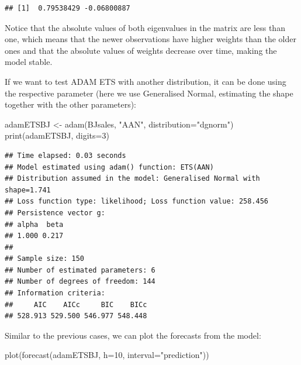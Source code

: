 \documentclass[
]{book}
\newenvironment{Shaded}{\begin{snugshade}}{\end{snugshade}}
\newcommand{\AttributeTok}[1]{\textcolor[rgb]{0.77,0.63,0.00}{#1}}
\newcommand{\DecValTok}[1]{\textcolor[rgb]{0.00,0.00,0.81}{#1}}
\newcommand{\FunctionTok}[1]{\textcolor[rgb]{0.00,0.00,0.00}{#1}}
\newcommand{\NormalTok}[1]{#1}
\newcommand{\OtherTok}[1]{\textcolor[rgb]{0.56,0.35,0.01}{#1}}
\newcommand{\StringTok}[1]{\textcolor[rgb]{0.31,0.60,0.02}{#1}}
\theoremstyle{definition}
\theoremstyle{definition}
\theoremstyle{definition}
\theoremstyle{definition}
\theoremstyle{remark}
\begin{document}
\begin{verbatim}
## [1]  0.79538429 -0.06800887
\end{verbatim}

Notice that the absolute values of both eigenvalues in the matrix are less than one, which means that the newer observations have higher weights than the older ones and that the absolute values of weights decrease over time, making the model stable.

If we want to test ADAM ETS with another distribution, it can be done using the respective parameter (here we use Generalised Normal, estimating the shape together with the other parameters):

\begin{Shaded}
\begin{Highlighting}[]
\NormalTok{adamETSBJ }\OtherTok{\textless{}{-}} \FunctionTok{adam}\NormalTok{(BJsales, }\StringTok{"AAN"}\NormalTok{, }\AttributeTok{distribution=}\StringTok{"dgnorm"}\NormalTok{)}
\FunctionTok{print}\NormalTok{(adamETSBJ, }\AttributeTok{digits=}\DecValTok{3}\NormalTok{)}
\end{Highlighting}
\end{Shaded}

\begin{verbatim}
## Time elapsed: 0.03 seconds
## Model estimated using adam() function: ETS(AAN)
## Distribution assumed in the model: Generalised Normal with shape=1.741
## Loss function type: likelihood; Loss function value: 258.456
## Persistence vector g:
## alpha  beta 
## 1.000 0.217 
## 
## Sample size: 150
## Number of estimated parameters: 6
## Number of degrees of freedom: 144
## Information criteria:
##     AIC    AICc     BIC    BICc 
## 528.913 529.500 546.977 548.448
\end{verbatim}

Similar to the previous cases, we can plot the forecasts from the model:

\begin{Shaded}
\begin{Highlighting}[]
\FunctionTok{plot}\NormalTok{(}\FunctionTok{forecast}\NormalTok{(adamETSBJ, }\AttributeTok{h=}\DecValTok{10}\NormalTok{, }\AttributeTok{interval=}\StringTok{"prediction"}\NormalTok{))}
\end{Highlighting}
\end{Shaded}
\end{document}
